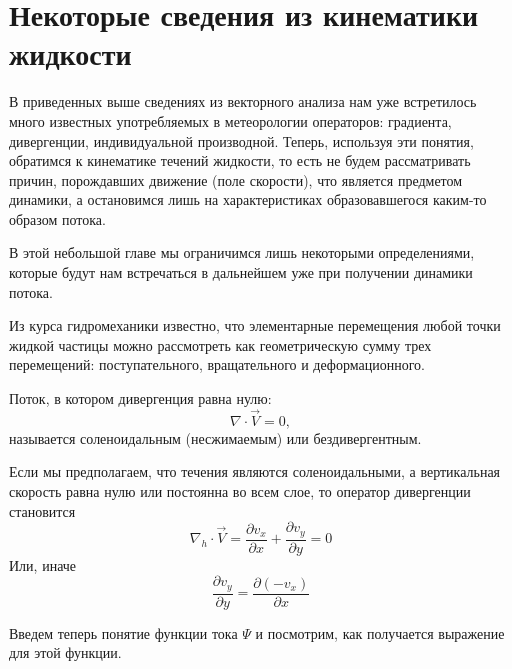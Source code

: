 \chapter{Некоторые сведения из кинематики жидкости}

В приведенных выше сведениях из векторного анализа нам уже встретилось много известных употребляемых в метеорологии  операторов: градиента, дивергенции, индивидуальной производной. Теперь, используя эти понятия, обратимся к кинематике течений жидкости, то есть не будем рассматривать причин, порождавших движение (поле скорости), что является предметом динамики, а остановимся лишь на характеристиках образовавшегося каким-то образом потока.

В этой небольшой главе мы ограничимся лишь некоторыми определениями, которые будут нам встречаться в дальнейшем уже при получении динамики потока.

Из курса гидромеханики известно, что элементарные перемещения любой точки жидкой частицы можно рассмотреть как геометрическую сумму трех перемещений: поступательного, вращательного и деформационного.

Поток, в котором дивергенция равна нулю:
\begin{equation}
\nabla \cdot \vec{V} = 0,
\end{equation}
называется соленоидальным (несжимаемым) или бездивергентным.



Если мы предполагаем, что течения являются соленоидальными, а вертикальная скорость равна нулю или постоянна во всем слое, то оператор дивергенции становится
\begin{equation}
\nabla_h \cdot \vec{V} = \frac{\partial v_x}{\partial x} + \frac{\partial v_y}{\partial y} = 0
\end{equation}
Или, иначе 
\begin{equation}
\frac{\partial v_y}{\partial y} = \frac{\partial (-v_x)}{\partial x}
\end{equation}

Введем теперь понятие функции тока $\Psi$ и посмотрим, как получается выражение для этой функции.


